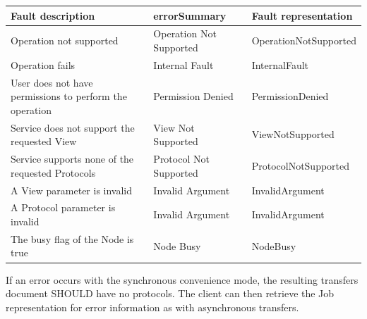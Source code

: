 \documentclass[11pt,a4paper]{ivoa}
\begin{document}
\vspace{3mm}
\begin{tabular}{ p{5cm} l p{4cm} }
\textbf{Fault description} & \textbf{errorSummary} & \textbf{Fault representation} \\
\hline
Operation not supported & Operation Not Supported & OperationNotSupported \\
\hline
Operation fails & Internal Fault & InternalFault \\
\hline
User does not have permissions to perform the operation & Permission Denied & PermissionDenied \\
\hline
Service does not support the requested View & View Not Supported & ViewNotSupported \\
\hline
Service supports none of the requested Protocols & Protocol Not Supported &ProtocolNotSupported \\
\hline
A View parameter is invalid & Invalid Argument & InvalidArgument \\
\hline
A Protocol parameter is invalid & Invalid Argument & InvalidArgument \\
\hline
The busy flag of the Node is true & Node Busy & NodeBusy \\
\hline
\end{tabular}
\vspace{3mm}

If an error occurs with the synchronous convenience mode, the resulting transfers document SHOULD have no protocols. The client can then retrieve the Job representation for error information as with asynchronous transfers.
\end{document}
